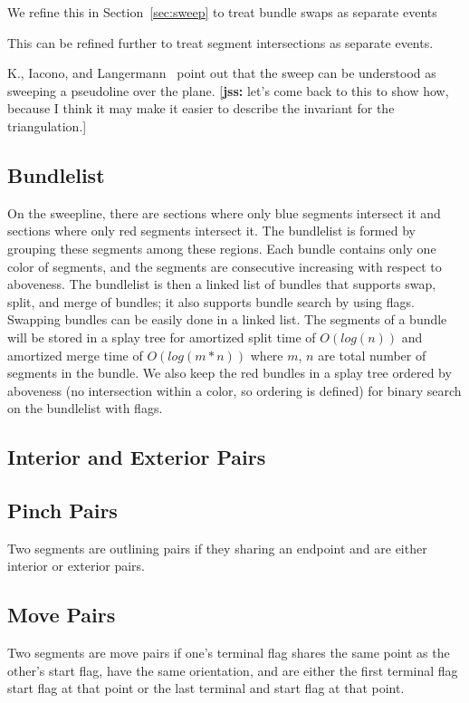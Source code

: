 \documentclass[11pt]{article}
\def\jss#1{{\footnotesize [{\bf jss:} #1]}}
\begin{document}
We refine this in Section~\ref{sec:sweep} to treat bundle swaps as separate events

This can be refined further to treat segment intersections as separate events. 

K., Iacono, and Langermann~\cite{}  point out that the sweep can be understood as sweeping a pseudoline over the plane.  \jss{let's come back to this to show how, because I think it may make it easier to describe the invariant for the triangulation.}

\subsection{Bundlelist}
On the sweepline, there are sections where only blue segments intersect it and sections where only red segments intersect it. 
The bundlelist is formed by grouping these segments among these regions.
Each bundle contains only one color of segments, and the segments are consecutive increasing with respect to aboveness.
The bundlelist is then a linked list of bundles that supports swap, split, and merge of bundles; it also supports bundle search by using flags.
Swapping bundles can be easily done in a linked list.
The segments of a bundle will be stored in a splay tree for amortized split time of $O(log(n))$ and amortized merge time of $O(log(m*n))$ where $m$, $n$ are total number of segments in the bundle.
We also keep the red bundles in a splay tree ordered by aboveness (no intersection within a color, so ordering is defined) for binary search on the bundlelist with flags.

\subsection{Interior and Exterior Pairs}

\subsection{Pinch Pairs}
Two segments are outlining pairs if they sharing an endpoint and are either interior or exterior pairs.

\subsection{Move Pairs}
Two segments are move pairs if one's terminal flag shares the same point as the other's start flag, have the same orientation, and are either the first terminal flag start flag at that point or the last terminal and start flag at that point.
\end{document}
